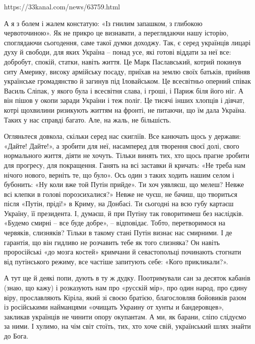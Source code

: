  
 
 
 
 

https://33kanal.com/news/63759.html

А я з болем і жалем констатую: «Із гнилим запашком, з глибокою червоточиною».
Як не прикро це визнавати, а переглядаючи нашу історію, споглядаючи сьогодення,
саме такої думки доходжу. Так, є серед українців лицарі духу й свободи, для
яких Україна – понад усе, які готові віддати за неї все: добробут, спокій,
статки, навіть життя. Це Марк Паславський, котрий покинув ситу Америку, високу
армійську посаду, приїхав на землю своїх батьків, прийняв українське
громадянство й загинув під Іловайськом. Це всесвітньо оперний співак Василь
Сліпак, у якого була і всесвітня слава, і гроші, і Париж біля його ніг. А він
пішов у окопи заради України і теж поліг. Це тисячі інших хлопців і дівчат,
котрі щохвилини ризикують життям на фронті, не питаючи, що їм дала Україна.
Таких у нас справді багато. Але, на жаль, не більшість.

Огляньтеся довкола, скільки серед нас скигліїв. Все канючать щось у держави:
«Дайте! Дайте!», а зробити для неї, насамперед для творення своєї долі, свого
нормального життя, діяти не хочуть. Тільки винять тих, хто щось прагне зробити
для прогресу, для покращення. Ганять на всі заставки й кричать: «Не треба нам
нічого нового, верніть те, що було». Ось один з таких ходить нашим селом і
бубонить: «Ну коли вже той Путін прийде». Ти хоч уявляєш, що мелеш? Невже всі
клепки в голові порозсихалися?» Невже не чуєш, не бачиш, що твориться після
«Путін, пріді!» в Криму, на Донбасі. Ти сьогодні на всю губу картаєш Україну,
її президента. І, думаєш, й при Путіну так говоритимеш без наслідків. «Будемо
смирні – все буде добре», – відповідає. Тобто, перетворимося на червяків,
слизняків? Тільки в такому стані Путін визнає нас смирними. І де гарантія, що
він гидливо не розчавить тебе як того слизняка? Он навіть проросійські «до
мозга костей» кримчани й севастопольці починають стогнати від путінського
режиму, все частіше запитують себе: «Кого прикликали?».

А тут ще й деякі попи, дують в ту ж дудку. Поотримували сан за десяток кабанів
(знаю, що кажу) і розказують нам про «русскій мір», про один народ, про єдину
віру, прославляють Кіріла, який зі своєю братією, благословляв бойовиків разом
із російськими найманцями «очищать Украину от хунты и бандеровцев», закликав
українців не чинити опору окупантам. А ми, як барани, сліпо слідуємо за ними. І
хулимо, на чім світ стоїть, тих, хто хоче свій, український шлях знайти до
Бога.

